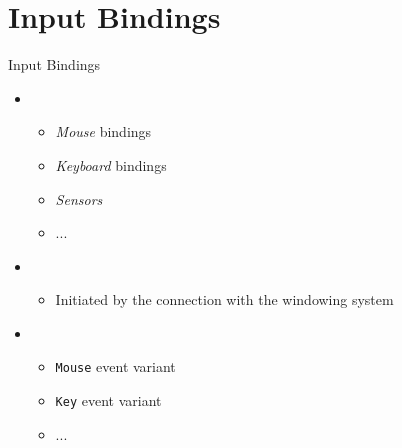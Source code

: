 
\section{Input Bindings}

\begin{frame}[t]{Input Bindings}

    \begin{itemize}
        \itemsep.3em

        \item {}
            \begin{itemize}
                \item \textit{Mouse} bindings
                \item \textit{Keyboard} bindings
                \item \textit{Sensors}
                \item ...
            \end{itemize}

        \item {}
            \begin{itemize}
                \item Initiated by the connection with the windowing system
            \end{itemize}

        \item {}
            \begin{itemize}
                \item \texttt{Mouse} event variant
                \item \texttt{Key} event variant
                \item ...

            \end{itemize}

    \end{itemize}

    \vfill

\end{frame}


